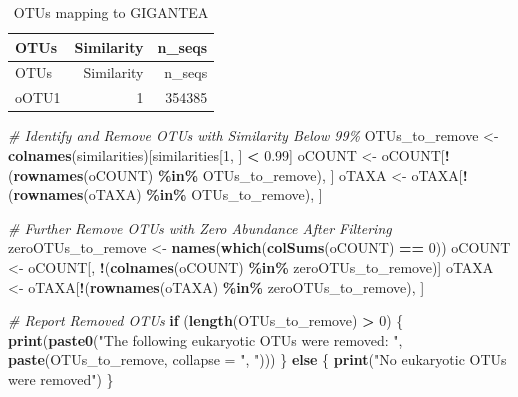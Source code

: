 \documentclass[
  11pt,
]{article}
\newenvironment{Shaded}{\begin{snugshade}}{\end{snugshade}}
\newcommand{\AttributeTok}[1]{\textcolor[rgb]{0.13,0.29,0.53}{#1}}
\newcommand{\CommentTok}[1]{\textcolor[rgb]{0.56,0.35,0.01}{\textit{#1}}}
\newcommand{\ControlFlowTok}[1]{\textcolor[rgb]{0.13,0.29,0.53}{\textbf{#1}}}
\newcommand{\DecValTok}[1]{\textcolor[rgb]{0.00,0.00,0.81}{#1}}
\newcommand{\FloatTok}[1]{\textcolor[rgb]{0.00,0.00,0.81}{#1}}
\newcommand{\FunctionTok}[1]{\textcolor[rgb]{0.13,0.29,0.53}{\textbf{#1}}}
\newcommand{\NormalTok}[1]{#1}
\newcommand{\OtherTok}[1]{\textcolor[rgb]{0.56,0.35,0.01}{#1}}
\newcommand{\SpecialCharTok}[1]{\textcolor[rgb]{0.81,0.36,0.00}{\textbf{#1}}}
\newcommand{\StringTok}[1]{\textcolor[rgb]{0.31,0.60,0.02}{#1}}
\begin{document}
\begin{longtable}[]{@{}lrr@{}}
\caption{OTUs mapping to GIGANTEA}\tabularnewline
\toprule\noalign{}
OTUs & Similarity & n\_seqs \\
\midrule\noalign{}
\endfirsthead
\toprule\noalign{}
OTUs & Similarity & n\_seqs \\
\midrule\noalign{}
\endhead
\bottomrule\noalign{}
\endlastfoot
oOTU1 & 1 & 354385 \\
\end{longtable}

\begin{Shaded}
\begin{Highlighting}[]
\CommentTok{\# Identify and Remove OTUs with Similarity Below 99\%}
\NormalTok{OTUs\_to\_remove }\OtherTok{\textless{}{-}} \FunctionTok{colnames}\NormalTok{(similarities)[similarities[}\DecValTok{1}\NormalTok{, ] }\SpecialCharTok{\textless{}} \FloatTok{0.99}\NormalTok{]}
\NormalTok{oCOUNT }\OtherTok{\textless{}{-}}\NormalTok{ oCOUNT[}\SpecialCharTok{!}\NormalTok{(}\FunctionTok{rownames}\NormalTok{(oCOUNT) }\SpecialCharTok{\%in\%}\NormalTok{ OTUs\_to\_remove), ]}
\NormalTok{oTAXA }\OtherTok{\textless{}{-}}\NormalTok{ oTAXA[}\SpecialCharTok{!}\NormalTok{(}\FunctionTok{rownames}\NormalTok{(oTAXA) }\SpecialCharTok{\%in\%}\NormalTok{ OTUs\_to\_remove), ]}

\CommentTok{\# Further Remove OTUs with Zero Abundance After Filtering}
\NormalTok{zeroOTUs\_to\_remove }\OtherTok{\textless{}{-}} \FunctionTok{names}\NormalTok{(}\FunctionTok{which}\NormalTok{(}\FunctionTok{colSums}\NormalTok{(oCOUNT) }\SpecialCharTok{==} \DecValTok{0}\NormalTok{))}
\NormalTok{oCOUNT }\OtherTok{\textless{}{-}}\NormalTok{ oCOUNT[, }\SpecialCharTok{!}\NormalTok{(}\FunctionTok{colnames}\NormalTok{(oCOUNT) }\SpecialCharTok{\%in\%}\NormalTok{ zeroOTUs\_to\_remove)]}
\NormalTok{oTAXA }\OtherTok{\textless{}{-}}\NormalTok{ oTAXA[}\SpecialCharTok{!}\NormalTok{(}\FunctionTok{rownames}\NormalTok{(oTAXA) }\SpecialCharTok{\%in\%}\NormalTok{ zeroOTUs\_to\_remove), ]}

\CommentTok{\# Report Removed OTUs}
\ControlFlowTok{if}\NormalTok{ (}\FunctionTok{length}\NormalTok{(OTUs\_to\_remove) }\SpecialCharTok{\textgreater{}} \DecValTok{0}\NormalTok{) \{}
  \FunctionTok{print}\NormalTok{(}\FunctionTok{paste0}\NormalTok{(}\StringTok{"The following eukaryotic OTUs were removed: "}\NormalTok{, }\FunctionTok{paste}\NormalTok{(OTUs\_to\_remove, }\AttributeTok{collapse =} \StringTok{", "}\NormalTok{)))}
\NormalTok{\} }\ControlFlowTok{else}\NormalTok{ \{}
  \FunctionTok{print}\NormalTok{(}\StringTok{"No eukaryotic OTUs were removed"}\NormalTok{)}
\NormalTok{\}}
\end{Highlighting}
\end{Shaded}
\end{document}
